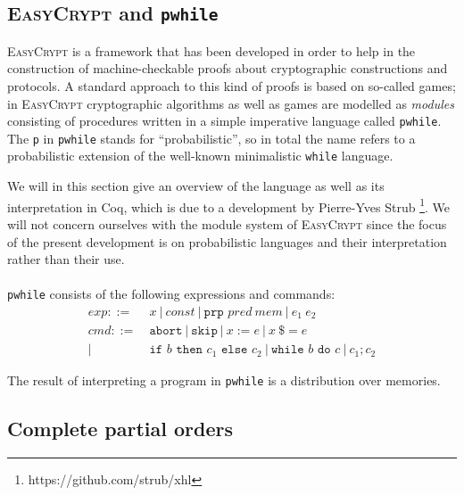 \documentclass[11pt, leqno]{article}
\theoremstyle{definition}
\begin{document}
\subsection{\textsc{EasyCrypt} and \texttt{pwhile}}
\textsc{EasyCrypt} is a framework that has been developed in order to help in the
construction of machine-checkable proofs about cryptographic constructions and
protocols. %
A standard approach to this kind of proofs is based on so-called games; in
\textsc{EasyCrypt} cryptographic algorithms as well as games are modelled as
\textit{modules} consisting of procedures written in a simple imperative language
called \texttt{pwhile}. The \texttt{p} in \texttt{pwhile} stands for
``probabilistic'', so in total the name refers to a probabilistic extension of the
well-known minimalistic \texttt{while} language.

We will in this section give an overview of the language as well as its
interpretation in Coq, which is due to a development by Pierre-Yves Strub
\footnote{https://github.com/strub/xhl}. We will not concern ourselves with the
module system of \textsc{EasyCrypt} since the focus of the present development is
on probabilistic languages and their interpretation rather than their use.\\
\\
\texttt{pwhile} consists of the following expressions and commands: 
\begin{align*}
  exp ::=~& x ~\vert ~ const ~\vert ~ \texttt{prp } pred~mem ~\vert ~ e_1\ e_2\\
  cmd ::=~& \texttt{abort} ~\vert ~ \texttt{skip} ~\vert ~ x := e ~\vert ~ x\ \$= e\\
  \vert ~ & \texttt{if } b \texttt{ then } c_1 \texttt{ else } c_2 ~\vert ~
            \texttt{while } b \texttt{ do } c ~\vert ~ c_1 ; c_2
\end{align*}


The result of interpreting a program in \texttt{pwhile} is a distribution over
memories. 


\subsection{Complete partial orders}
\end{document}
